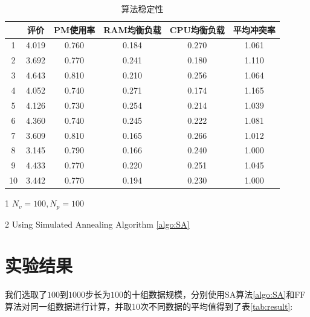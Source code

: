 \begin{table}[htbp]
  \centering
  \small
  \begin{threeparttable}
    \caption{\label{tab:stability}算法稳定性}
    \begin{tabular}{cccccc}
      \toprule
        & 评价 & PM使用率 & RAM均衡负载 & CPU均衡负载 & 平均冲突率 \\
      \midrule
      1 & 4.019 & 0.760 & 0.184 & 0.270 & 1.061 \\
      2 & 3.692 & 0.770 & 0.241 & 0.180 & 1.110 \\
      3 & 4.643 & 0.810 & 0.210 & 0.256 & 1.064 \\
      4 & 4.052 & 0.740 & 0.271 & 0.174 & 1.165 \\
      5 & 4.126 & 0.730 & 0.254 & 0.214 & 1.039 \\
      6 & 4.360 & 0.740 & 0.245 & 0.222 & 1.081 \\
      7 & 3.609 & 0.810 & 0.165 & 0.266 & 1.012 \\
      8 & 3.145 & 0.790 & 0.166 & 0.240 & 1.000 \\
      9 & 4.433 & 0.770 & 0.220 & 0.251 & 1.045 \\
     10 & 3.442 & 0.770 & 0.194 & 0.230 & 1.000 \\
      \bottomrule
    \end{tabular}
    \tiny
    \begin{tablenotes}
    \item [1]$N_v = 100,N_p = 100$

    \item [2] Using Simulated Annealing Algorithm \ref{algo:SA}
    \end{tablenotes}
  \end{threeparttable}
\end{table}

\section{实验结果}
我们选取了$100$到$1000$步长为$100$的十组数据规模，分别使用SA算法\ref{algo:SA}和FF算法对同一组数据进行计算，并取10次不同数据的平均值得到了表\ref{tab:result}:

